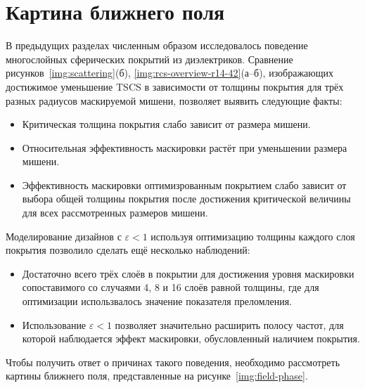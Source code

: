 \section{Картина ближнего поля}\label{sec:near-field}

В предыдущих разделах численным образом исследовалось поведение
многослойных сферических покрытий из диэлектриков. Сравнение
рисунков~\ref{img:scattering}(б), \ref{img:rcs-overview-r14-42}(а--б),
изображающих достижимое уменьшение TSCS в зависимости от толщины
покрытия для трёх разных радиусов маскируемой мишени, позволяет
выявить следующие факты:
\begin{itemize}
\item Критическая толщина покрытия слабо зависит от размера мишени.
\item Относительная эффективность маскировки растёт при уменьшении
  размера мишени.
\item Эффективность маскировки оптимизрованным покрытием слабо зависит
  от выбора общей толщины покрытия после достижения критической
  величины для всех рассмотренных размеров мишени.
\end{itemize}
Моделирование дизайнов с ${\varepsilon<1}$ используя оптимизацию
толщины каждого слоя покрытия позволило сделать ещё несколько
наблюдений:
\begin{itemize}
\item Достаточно всего трёх слоёв в покрытии для достижения уровня
  маскировки сопоставимого со случаями 4, 8 и 16 слоёв равной толщины,
  где для оптимизации использвалось значение показателя преломления.
\item Использование ${\varepsilon<1}$ позволяет значительно расширить
  полосу частот, для которой наблюдается эффект маскировки,
  обусловленный наличием покрытия.
\end{itemize}
Чтобы получить ответ о причинах такого поведения, необходимо
рассмотреть картины ближнего поля, представленные на рисунке~\ref{img:field-phase}.


